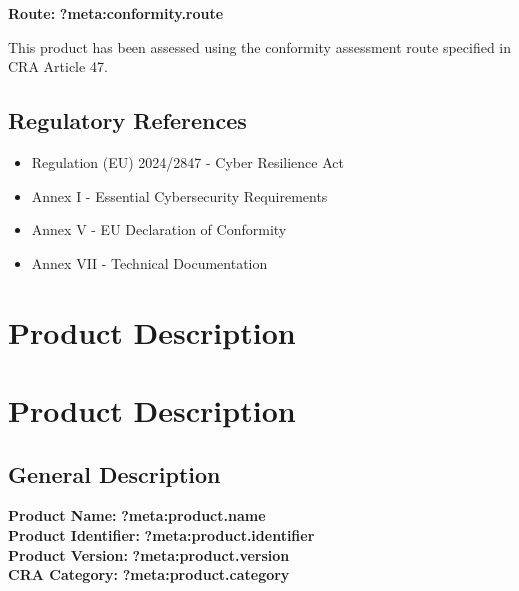 \documentclass[
  11 pt,
  a4paper,
  table]{report}
\providecommand{\tightlist}{%
  \setlength{\itemsep}{0pt}\setlength{\parskip}{0pt}}\usepackage{longtable,booktabs,array}
\begin{document}
\textbf{Route:} \textbf{?meta:conformity.route}

\begin{tcolorbox}[enhanced jigsaw, coltitle=black, bottomrule=.15mm, colback=white, leftrule=.75mm, opacitybacktitle=0.6, rightrule=.15mm, opacityback=0, arc=.35mm, toprule=.15mm, colframe=quarto-callout-note-color-frame, breakable, left=2mm, colbacktitle=quarto-callout-note-color!10!white, titlerule=0mm, bottomtitle=1mm, toptitle=1mm, title=\textcolor{quarto-callout-note-color}{\faInfo}\hspace{0.5em}{Note}]

This product has been assessed using the conformity assessment route
specified in CRA Article 47.

\end{tcolorbox}

\section{Regulatory References}\label{regulatory-references}

\begin{itemize}
\tightlist
\item
  Regulation (EU) 2024/2847 - Cyber Resilience Act
\item
  Annex I - Essential Cybersecurity Requirements
\item
  Annex V - EU Declaration of Conformity
\item
  Annex VII - Technical Documentation
\end{itemize}


\chapter{Product Description}\label{product-description}


\chapter{Product Description}\label{product-description-1}

\section{General Description}\label{general-description}

\textbf{Product Name:} \textbf{?meta:product.name}\\
\textbf{Product Identifier:} \textbf{?meta:product.identifier}\\
\textbf{Product Version:} \textbf{?meta:product.version}\\
\textbf{CRA Category:} \textbf{?meta:product.category}
\end{document}
